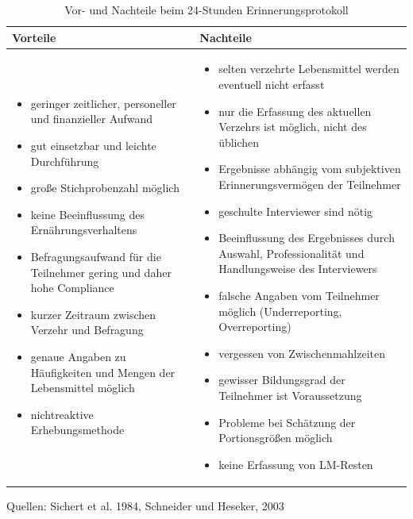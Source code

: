 

\begin{table}[!h]
\begin{flushleft}
\caption{Vor- und Nachteile beim 24-Stunden Erinnerungsprotokoll}
\end{flushleft}
\begin{tabular}{p{7cm} p{7cm}}
Vorteile & Nachteile \\
\hline

\begin{itemize}
\item geringer zeitlicher, personeller und finanzieller Aufwand
\item gut einsetzbar und leichte Durchführung
\item große Stichprobenzahl möglich
\item keine Beeinflussung des Ernährungsverhaltens
\item Befragungsaufwand für die Teilnehmer gering und daher hohe Compliance
\item kurzer Zeitraum zwischen Verzehr und Befragung
\item genaue Angaben zu Häufigkeiten und Mengen der Lebensmittel möglich
\item nichtreaktive Erhebungsmethode

\end{itemize}

&

\begin{itemize}
\item selten verzehrte Lebensmittel werden eventuell nicht erfasst
\item nur die Erfassung des aktuellen Verzehrs ist möglich, nicht des üblichen
\item Ergebnisse abhängig vom subjektiven Erinnerungsvermögen der Teilnehmer
\item geschulte Interviewer sind nötig
\item Beeinflussung des Ergebnisses durch Auswahl, Professionalität und Handlungsweise des Interviewers 
\item falsche Angaben vom Teilnehmer möglich (Underreporting, Overreporting)
\item vergessen von Zwischenmahlzeiten
\item gewisser Bildungsgrad der Teilnehmer ist Voraussetzung
\item Probleme bei Schätzung der Portionsgrößen möglich
\item keine Erfassung von LM-Resten

\end{itemize}
\end{tabular}
\label{tab:24-Stunden}
Quellen: Sichert et al. 1984, Schneider und Heseker, 2003
\end{table}

